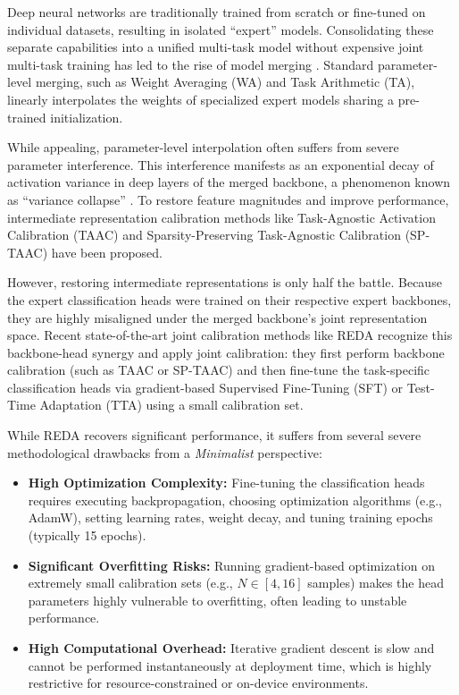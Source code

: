 \documentclass{article}
\theoremstyle{plain}
\theoremstyle{definition}
\theoremstyle{remark}
\begin{document}
Deep neural networks are traditionally trained from scratch or fine-tuned on individual datasets, resulting in isolated ``expert'' models. Consolidating these separate capabilities into a unified multi-task model without expensive joint multi-task training has led to the rise of model merging \cite{Wortsman22, Ilharco22, Yadav23}. Standard parameter-level merging, such as Weight Averaging (WA) and Task Arithmetic (TA), linearly interpolates the weights of specialized expert models sharing a pre-trained initialization.

While appealing, parameter-level interpolation often suffers from severe parameter interference. This interference manifests as an exponential decay of activation variance in deep layers of the merged backbone, a phenomenon known as ``variance collapse'' \cite{Jordan23}. To restore feature magnitudes and improve performance, intermediate representation calibration methods like Task-Agnostic Activation Calibration (TAAC) \cite{TAAC26} and Sparsity-Preserving Task-Agnostic Calibration (SP-TAAC) \cite{SPTAAC26} have been proposed.

However, restoring intermediate representations is only half the battle. Because the expert classification heads were trained on their respective expert backbones, they are highly misaligned under the merged backbone's joint representation space. Recent state-of-the-art joint calibration methods like REDA \cite{REDA26} recognize this backbone-head synergy and apply joint calibration: they first perform backbone calibration (such as TAAC or SP-TAAC) and then fine-tune the task-specific classification heads via gradient-based Supervised Fine-Tuning (SFT) or Test-Time Adaptation (TTA) using a small calibration set.

While REDA recovers significant performance, it suffers from several severe methodological drawbacks from a \emph{Minimalist} perspective:
\begin{itemize}
  \item \textbf{High Optimization Complexity:} Fine-tuning the classification heads requires executing backpropagation, choosing optimization algorithms (e.g., AdamW), setting learning rates, weight decay, and tuning training epochs (typically 15 epochs).
  \item \textbf{Significant Overfitting Risks:} Running gradient-based optimization on extremely small calibration sets (e.g., $N \in [4, 16]$ samples) makes the head parameters highly vulnerable to overfitting, often leading to unstable performance.
  \item \textbf{High Computational Overhead:} Iterative gradient descent is slow and cannot be performed instantaneously at deployment time, which is highly restrictive for resource-constrained or on-device environments.
\end{itemize}
\end{document}
